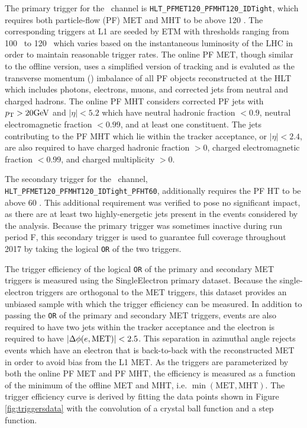 The primary trigger for the \ZnnH\ channel is \texttt{\small HLT\_PFMET120\_PFMHT120\_IDTight}, which requires both particle-flow (PF) MET and MHT to be above 120 \GeV. The corresponding triggers at L1 are seeded by ETM with thresholds ranging from 100 \GeV\ to 120 \GeV\, which varies based on the instantaneous luminosity of the LHC in order to maintain reasonable trigger rates. The online PF MET, though similar to the offline version, uses a simplified version of tracking and is evaluted as the transverse momentum (\pT) imbalance of all PF objects reconstructed at the HLT which includes photons, electrons, muons, and corrected jets from neutral and charged hadrons. The online PF MHT considers corrected PF jets with $p_{\mathrm{T}} > 20 \mathrm{GeV}$ and $\left|\eta\right| < 5.2$ which have neutral hadronic fraction $< 0.9$, neutral electromagnetic fraction $< 0.99$, and at least one constituent. The jets contributing to the PF MHT which lie within the tracker acceptance, or $\left|\eta\right| < 2.4$, are also required to have charged hadronic fraction $> 0$, charged electromagnetic fraction $< 0.99$, and charged multiplicity $> 0$.

The secondary trigger for the \ZnnH\ channel, \texttt{\small HLT\_PFMET120\_PFMHT120\_IDTight\_PFHT60}, additionally requires the PF HT to be above 60 \GeV. This additional requirement was verified to pose no significant impact, as there are at least two highly-energetic jets present in the events considered by the analysis. Because the primary trigger was sometimes inactive during run period F, this secondary trigger is used to guarantee full coverage throughout 2017 by taking the logical \texttt{OR} of the two triggers.

The trigger efficiency of the logical \texttt{OR} of the primary and secondary MET triggers is measured using the SingleElectron primary dataset. Because the single-electron triggers are orthogonal to the MET triggers, this dataset provides an unbiased sample with which the trigger efficiency can be measured. In addition to passing the \texttt{OR} of the primary and secondary MET triggers, events are also required to have two jets within the tracker acceptance and the electron is required to have $\left|\Delta\phi(e, \textrm{MET})\right| < 2.5$. This separation in azimuthal angle rejects events which have an electron that is back-to-back with the reconstructed MET in order to avoid bias from the L1 MET. As the triggers are parameterized by both the online PF MET and PF MHT, the efficiency is measured as a function of the minimum of the offline MET and MHT, i.e. $\min(\textrm{MET}, \textrm{MHT})$. The trigger efficiency curve is derived by fitting the data points shown in Figure \ref{fig:triggersdata} with the convolution of a crystal ball function and a step function.

